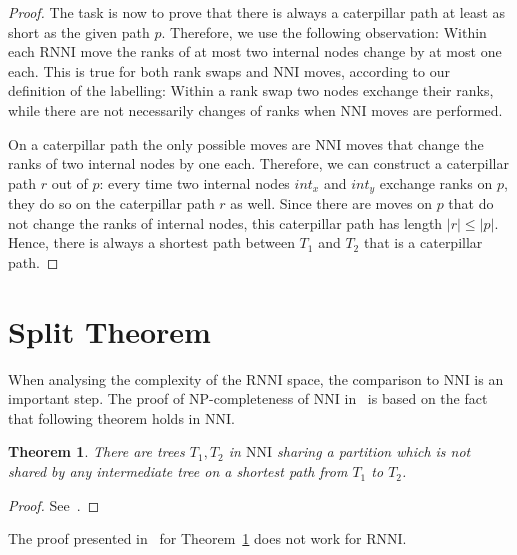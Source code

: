 \documentclass[11pt, a4paper]{article}
\newcommand{\nni}{\mathrm{NNI}}
\newcommand{\rnni}{\mathrm{RNNI}}
\newtheorem{theorem}[definition]{Theorem}
\begin{document}
\begin{proof}
	The task is now to prove that there is always a caterpillar path at least as short as the given path $p$.
	Therefore, we use the following observation:
	Within each $\rnni$ move the ranks of at most two internal nodes change by at most one each.
	This is true for both rank swaps and $\nni$ moves, according to our definition of the labelling:
	Within a rank swap two nodes exchange their ranks, while there are not necessarily changes of ranks when $\nni$ moves are performed.

	On a caterpillar path the only possible moves are $\nni$ moves that change the ranks of two internal nodes by one each.
	Therefore, we can construct a caterpillar path $r$ out of $p$:
	every time two internal nodes $int_x$ and $int_y$ exchange ranks on $p$, they do so on the caterpillar path $r$ as well.
	Since there are moves on $p$ that do not change the ranks of internal nodes, this caterpillar path has length $|r| \leq |p|$.
	Hence, there is always a shortest path between $T_1$ and $T_2$ that is a caterpillar path.
\end{proof}

\section{Split Theorem}

When analysing the complexity of the $\rnni$ space, the comparison to $\nni$ is an important step.
The proof of NP-completeness of $\nni$ in~\cite{jiang2000} is based on the fact that following theorem holds in $\nni$.

\begin{theorem}
	There are trees $T_1,T_2$ in $\nni$ sharing a partition which is not shared by any intermediate tree on a shortest path from $T_1$ to $T_2$.
	\label{thm:split_nni}
\end{theorem}

\begin{proof}
	See~\cite{Li1996}.
\end{proof}

The proof presented in~\cite{Li1996} for Theorem~\ref{thm:split_nni} does not work for $\rnni$.
\end{document}
